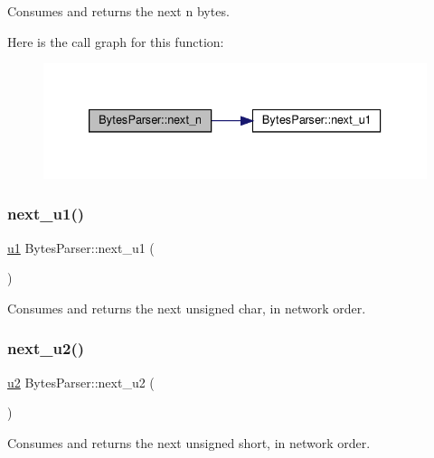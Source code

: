 Consumes and returns the next {\ttfamily n} bytes. 

Here is the call graph for this function\+:\nopagebreak
\begin{figure}[H]
\begin{center}
\leavevmode
\includegraphics[width=333pt]{classBytesParser_acb95ccefd93aa90ae9c74aaec13b497e_cgraph}
\end{center}
\end{figure}
\mbox{\label{classBytesParser_a18a5ff71458418a33c99d301ecc37579}} 
\subsubsection{\texorpdfstring{next\+\_\+u1()}{next\_u1()}}
{\footnotesize\ttfamily \hyperlink{types_8h_a162f47a77ee24f6f77cd8c82ccd40ab7}{u1} Bytes\+Parser\+::next\+\_\+u1 (\begin{DoxyParamCaption}{ }\end{DoxyParamCaption})}



Consumes and returns the next unsigned char, in network order. 

\mbox{\label{classBytesParser_a8c1d8a37eabff268351e38706a78ce2a}} 
\subsubsection{\texorpdfstring{next\+\_\+u2()}{next\_u2()}}
{\footnotesize\ttfamily \hyperlink{types_8h_ae676e9207f57fb921dca7366b2f59c53}{u2} Bytes\+Parser\+::next\+\_\+u2 (\begin{DoxyParamCaption}{ }\end{DoxyParamCaption})}



Consumes and returns the next unsigned short, in network order. 

